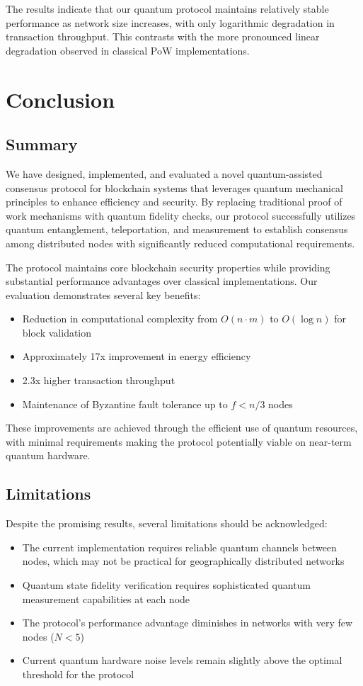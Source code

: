 \documentclass[11pt,a4paper]{article}
\begin{document}
The results indicate that our quantum protocol maintains relatively stable performance as network size increases, with only logarithmic degradation in transaction throughput. This contrasts with the more pronounced linear degradation observed in classical PoW implementations.

\section{Conclusion}

\subsection{Summary}
We have designed, implemented, and evaluated a novel quantum-assisted consensus protocol for blockchain systems that leverages quantum mechanical principles to enhance efficiency and security. By replacing traditional proof of work mechanisms with quantum fidelity checks, our protocol successfully utilizes quantum entanglement, teleportation, and measurement to establish consensus among distributed nodes with significantly reduced computational requirements.

The protocol maintains core blockchain security properties while providing substantial performance advantages over classical implementations. Our evaluation demonstrates several key benefits:

\begin{itemize}
    \item Reduction in computational complexity from $O(n \cdot m)$ to $O(\log n)$ for block validation
    \item Approximately 17x improvement in energy efficiency
    \item 2.3x higher transaction throughput
    \item Maintenance of Byzantine fault tolerance up to $f < n/3$ nodes
\end{itemize}

These improvements are achieved through the efficient use of quantum resources, with minimal requirements making the protocol potentially viable on near-term quantum hardware.

\subsection{Limitations}
Despite the promising results, several limitations should be acknowledged:

\begin{itemize}
    \item The current implementation requires reliable quantum channels between nodes, which may not be practical for geographically distributed networks
    \item Quantum state fidelity verification requires sophisticated quantum measurement capabilities at each node
    \item The protocol's performance advantage diminishes in networks with very few nodes ($N < 5$)
    \item Current quantum hardware noise levels remain slightly above the optimal threshold for the protocol
\end{itemize}
\end{document}
